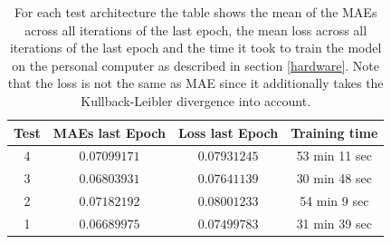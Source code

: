 \begin{center}
    \begin{table}[H]
        \centering
        \begin{tabular}{ | c | c | c | c | }
            \hline
            Test &MAEs last Epoch & Loss last Epoch & Training time\\ \hline
            4 & $0.07099171$  & $0.07931245$  & 53 min 11 sec  \\
            3 & $0.06803931$  & $0.07641139$  & 30 min 48 sec  \\
            2 & $0.07182192$  & $0.08001233$  & 54 min 9 sec  \\  
            1 & $0.06689975$  & $0.07499783$  & 31 min 39 sec  \\  
            \hline
        \end{tabular} 
        \caption{For each test architecture the table shows the mean of the MAEs across all iterations of the last
        epoch, the mean loss across all iterations of the last epoch and the time it took to train the model
        on the personal computer as described in section \ref{hardware}. Note that the loss is not the same
        as MAE since it additionally takes the Kullback-Leibler divergence into account.}
    \end{table} \label{table_maes4}
\end{center}

